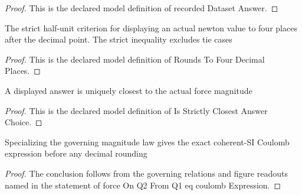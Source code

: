 \begin{proof}
  This is the declared model definition of recorded Dataset Answer.
\end{proof}
\begin{definition}
  \label{def:physics:phyx-mini-0992:phyxminiproblems-problemphyxmini0992-roundstofourdecimalplaces}
  The strict half-unit criterion for displaying an actual newton value to four places after the decimal point. The strict inequality excludes tie cases
\end{definition}
\begin{proof}
  This is the declared model definition of Rounds To Four Decimal Places.
\end{proof}
\begin{definition}
  \label{def:physics:phyx-mini-0992:phyxminiproblems-problemphyxmini0992-isstrictlyclosestanswerchoice}
  A displayed answer is uniquely closest to the actual force magnitude
\end{definition}
\begin{proof}
  This is the declared model definition of Is Strictly Closest Answer Choice.
\end{proof}
\begin{lemma}
  \label{lem:physics:phyx-mini-0992:phyxminiproblems-problemphyxmini0992-forceonq2fromq1-eq-coulombexpression}
  Specializing the governing magnitude law gives the exact coherent-SI Coulomb expression before any decimal rounding
\end{lemma}
\begin{proof}
  The conclusion follows from the governing relations and figure readouts named in the statement of force On Q2 From Q1 eq coulomb Expression.
\end{proof}
